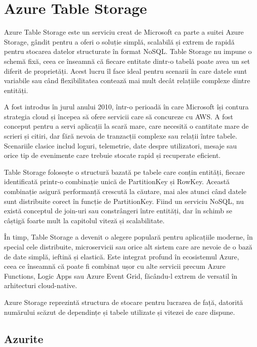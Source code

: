 \section{Azure Table Storage}
Azure Table Storage este un serviciu creat de Microsoft ca parte a suitei Azure Storage, gândit pentru a oferi o soluție simplă, scalabilă și extrem de rapidă pentru stocarea datelor structurate în format NoSQL. Table Storage nu impune o schemă fixă, ceea ce înseamnă că fiecare entitate dintr-o tabelă poate avea un set diferit de proprietăți. Acest lucru îl face ideal pentru scenarii în care datele sunt variabile sau când flexibilitatea contează mai mult decât relațiile complexe dintre entități. \parencite{azureStorage}

A fost introdus în jurul anului 2010, într-o perioadă în care Microsoft își contura strategia cloud și începea să ofere servicii care să concureze cu AWS. A fost conceput pentru a servi aplicații la scară mare, care necesită o cantitate mare de scrieri și citiri, dar fără nevoia de tranzacții complexe sau relații între tabele. Scenariile clasice includ loguri, telemetrie, date despre utilizatori, mesaje sau orice tip de evenimente care trebuie stocate rapid și recuperate eficient. \parencite{azureStorage}

Table Storage folosește o structură bazată pe tabele care conțin entități, fiecare identificată printr-o combinație unică de PartitionKey și RowKey. Această combinație asigură performanță crescută la căutare, mai ales atunci când datele sunt distribuite corect în funcție de PartitionKey. Fiind un serviciu NoSQL, nu există conceptul de join-uri sau constrângeri între entități, dar în schimb se câștigă foarte mult la capitolul viteză și scalabilitate. \parencite{azureStorage}

În timp, Table Storage a devenit o alegere populară pentru aplicațiile moderne, în special cele distribuite, microservicii sau orice alt sistem care are nevoie de o bază de date simplă, ieftină și elastică. Este integrat profund în ecosistemul Azure, ceea ce înseamnă că poate fi combinat ușor cu alte servicii precum Azure Functions, Logic Apps sau Azure Event Grid, făcându-l extrem de versatil în arhitecturi cloud-native. \parencite{azureStorage}

Azure Storage reprezintă structura de stocare pentru lucrarea de față, datorită numărului scăzut de dependințe și tabele utilizate și vitezei de care dispune.

\subsection{Azurite}

